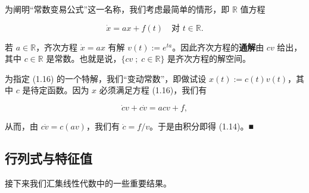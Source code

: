 \begin{remark}

为阐明“常数变易公式”这一名称，我们考虑最简单的情形，即 $ \mathbb{R} $ 值方程

\begin{equation}
\dot{x} = ax + f(t) \quad \text{对 } t \in \mathbb{R} .\tag{1.16}
\end{equation}

若 $ a \in \mathbb{R} $，齐次方程 $ \dot{x} = ax $ 有解 $ v(t) := e^{ta} $。因此齐次方程的\textbf{通解}由 $ cv $ 给出，其中 $ c \in \mathbb{R} $ 是常数。也就是说，$ \{cv \;;\; c \in \mathbb{R}\} $ 是齐次方程的解空间。

为指定 (1.16) 的一个特解，我们“变动常数”，即做试设 $ x(t) := c(t)v(t) $，其中 $ c $ 是待定函数。因为 $ x $ 必须满足方程 (1.16)，我们有

\[
\dot{c}v + c\dot{v} = acv + f ,
\]

从而，由 $ c\dot{v} = c(av) $，我们有 $ \dot{c} = f/v $。于是由积分即得 (1.14)。\nobreak\hspace{0.35em}■

\end{remark}

\subsection*{行列式与特征值}

接下来我们汇集线性代数中的一些重要结果。

